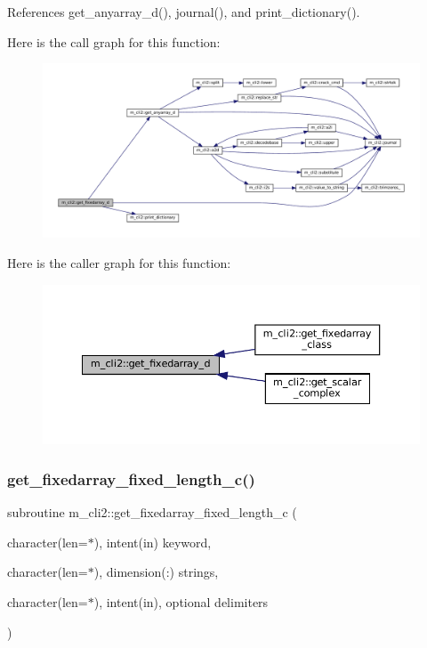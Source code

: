 References get\+\_\+anyarray\+\_\+d(), journal(), and print\+\_\+dictionary().

Here is the call graph for this function\+:\nopagebreak
\begin{figure}[H]
\begin{center}
\leavevmode
\includegraphics[width=350pt]{namespacem__cli2_a2c8db0f383888cb2b3ce8643de3fae93_cgraph}
\end{center}
\end{figure}
Here is the caller graph for this function\+:\nopagebreak
\begin{figure}[H]
\begin{center}
\leavevmode
\includegraphics[width=350pt]{namespacem__cli2_a2c8db0f383888cb2b3ce8643de3fae93_icgraph}
\end{center}
\end{figure}
\mbox{\label{namespacem__cli2_a8000c5e05f6c84ba17350d4a00850a6a}} 
\subsubsection{\texorpdfstring{get\+\_\+fixedarray\+\_\+fixed\+\_\+length\+\_\+c()}{get\_fixedarray\_fixed\_length\_c()}}
{\footnotesize\ttfamily subroutine m\+\_\+cli2\+::get\+\_\+fixedarray\+\_\+fixed\+\_\+length\+\_\+c (\begin{DoxyParamCaption}\item[{character(len=$\ast$), intent(in)}]{keyword,  }\item[{character(len=$\ast$), dimension(\+:)}]{strings,  }\item[{character(len=$\ast$), intent(in), optional}]{delimiters }\end{DoxyParamCaption})\hspace{0.3cm}{\ttfamily [private]}}



